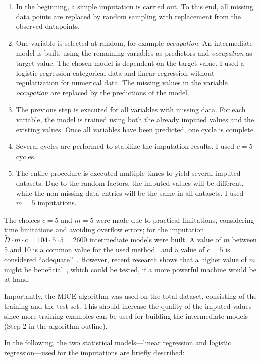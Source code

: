 \documentclass[a4paper]{article}
\begin{document}
\begin{enumerate}
\item In the beginning, a simple imputation is carried out. To
  this end, all missing data points are replaced by random sampling
  with replacement from the observed datapoints.
\item One variable is selected at random, for example
  \emph{occupation}. An intermediate model is built, using the
  remaining variables as predictors and \emph{occupation} as target
  value. The chosen model is dependent on the target value. I used a
  logistic regression categorical data and linear regression without
  regularization for numerical data. The missing values in the
  variable \emph{occupation} are replaced by the predictions of the
  model.
\item The previous step is executed for all variables with missing
  data. For each variable, the model is trained using both the already
  imputed values and the existing values. Once all variables have been
  predicted, one cycle is complete.
\item Several cycles are performed to stabilize the imputation
  results. I used $c = 5$ cycles.
\item The entire procedure is executed multiple times to yield
  several imputed datasets. Due to the random factors, the imputed
  values will be different, while the non-missing data entries will be
  the same in all datasets. I used $m = 5$ imputations.
\end{enumerate}
The choices $c = 5$ and $m = 5$ were made due to practical
limitations, considering time limitations and avoiding overflow
errors; for the imputation
$\tilde{D} \cdot m \cdot c = 104 \cdot 5 \cdot 5 = 2600$ intermediate
models were built. A value of $m$ between 5 and 10 is a common value
for the used method~\cite{royston2011multiple} and a value of $c = 5$
is considered ``adequate''~\cite{van1999multiple}. However, recent
research shows that a higher value of $m$ might be
beneficial~\cite{white2011multiple}, which could be tested, if a more
powerful machine would be at hand.

Importantly, the MICE algorithm was used on the total dataset,
consisting of the training and the test set. This should increase the
quality of the imputed values since more training examples can be used
for building the intermediate models (Step 2 in the algorithm
outline).

In the following, the two statistical models---linear regression and
logistic regression---used for the imputations are briefly described:
\end{document}
